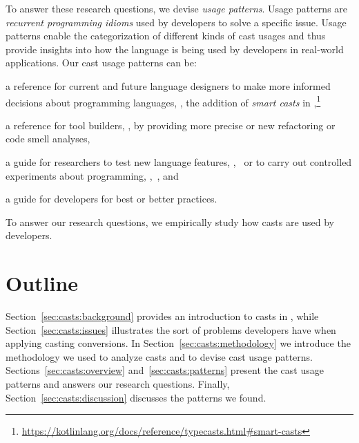 To answer these research questions, we devise
\emph{usage patterns}.
Usage patterns are \emph{recurrent programming idioms} used by developers to solve a specific issue.
Usage patterns enable the categorization of different kinds of cast usages and
thus provide insights into how the language is being used by developers in real-world applications.
Our cast usage patterns can be:
\begin{inparaenum}[(1)]
\item a reference for current and future language designers
to make more informed decisions about programming languages,
\eg{},
the addition of \emph{smart casts} in ,\footnote{\url{https://kotlinlang.org/docs/reference/typecasts.html\#smart-casts}}
\item a reference for tool builders, \eg{}, by providing more precise or new
  refactoring or code smell analyses,
\item a guide for researchers to test new language features, \eg{},~\cite{wintherGuardedTypePromotion2011} or to carry out controlled
  experiments about programming, \eg{},~\cite{stuchlikStaticVsDynamic2011}, and
\item a guide for developers for best or better practices.
\end{inparaenum}
To answer our research questions,
we empirically study how casts are used by developers.

\section*{Outline}

Section~\ref{sec:casts:background} provides an introduction to casts in \java{},
while Section~\ref{sec:casts:issues} illustrates the sort of problems developers have when applying casting conversions.
In Section~\ref{sec:casts:methodology} we introduce the methodology we used to analyze casts and to devise cast usage patterns.
Sections~\ref{sec:casts:overview} and~\ref{sec:casts:patterns} present the cast usage patterns and answers our research questions.
Finally, Section~\ref{sec:casts:discussion} discusses the patterns we found.


\newcommand\urlbox{\null\hfill\colorbox{lightgray}{\scriptsize\url{\urlvar}}}
\newcommand\qlbox{\null\hfill\colorbox{lime}{\footnotesize\ql{}}}







